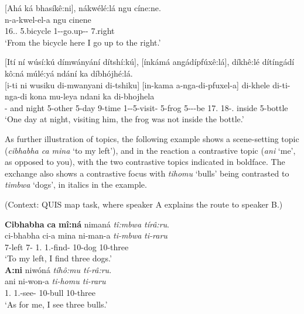 \documentclass[output=paper]{langscibook}
\begin{document}
\ea
\label{bkm:Ref121993048}
[Ahá ká bhasíkê:ni], nákwélé:lá ngu cíne:ne.\\
  n-a-kwel-el-a  ngu  cinene\\
16.\DEM.\PROX{}  \LOC{}  5.bicycle  1\SM{}-\PRS{}-go.up-\APPL{}-\FV{}  \PREP{}  7.right\\
\glt
‘From the bicycle here I go up to the right.’\\

 
\z
\pagebreak

\ea
\label{bkm:Ref121993050}
{}[Ití ní wúsí:kú dímwányání dítshí:kú], [ínkámá angádípfúxê:lá], díkhê:lé dítíngádí kô:ná múlé:yá ndání ka díbhójhé:lá. \\
\gll
{}[i-ti  ni  wusiku  di-mwanyani  di-tshiku]  [in-kama  a-nga-di-pfuxel-a]  di-khele     di-ti-nga-di  kona  mu-leya  ndani  ka  di-bhojhela \\
{\db}\COP{}-\PST{}  and  night  5-other  5-day  {\db}9-time  1\SM-\REL{}-5\OM{}-visit-\FV{}  5-frog 5\SM{}-\IPFV{}-\NEG{}-be  17.\PRO{}  18-\DEM.\DIST{}  inside  \LOC{}  5-bottle \\
\glt
‘One day at night, visiting him, the frog was not inside the bottle.’\\

\z

As further illustration of topics, the following example  shows a scene-setting topic (\textit{cibhabha ca mina} ‘to my left’), and in the reaction a contrastive topic (\textit{ani} ‘me’, as opposed to you), with the two contrastive topics indicated in boldface. The exchange also shows a contrastive focus with \textit{tihomu} ‘bulls’ being contrasted to \textit{timbwa} ‘dogs’, in italics in the example.

\ea
(Context: QUIS map task, where speaker A explains the route to speaker B.)\\
\begin{xlist}
\label{bkm:Ref146270541}
\textbf{Cibhabha} \textbf{ca} \textbf{mî:ná} nimaná \textit{tî:mbwa tírâ:ru}.\\
\gll
ci-bhabha  ci-a  mina  ni-man-a  \textit{ti-mbwa}  \textit{ti-raru}\\
7-left  7-\CONN{}  1\SG.\PRO{}  1\SG.\SM{}-find-\FV{}  10-dog  10-three\\
\glt
‘To my left, I find three dogs.’\\

\textbf{A:ni} niwóná \textit{tíhô:mu tí-râ:ru}.\\
\gll
ani  ni-won-a  \textit{ti-homu  ti-raru}\\
1\SG.\PRO{}  1\SG.\SM{}-see-\FV{}  10-bull  10-three\\
\glt
‘As for me, I see three bulls.’

\end{xlist}
\z
\end{document}
